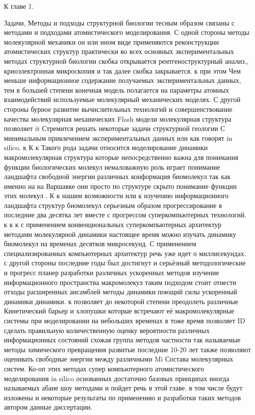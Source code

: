 ﻿К главе 1. 


Задачи, Методы и подходы структурной биологии тесным образом связаны с методами и подходами атомистического моделирования. С одной стороны методы молекулярной механики он или ином виде применяются реконструкции атомистических структур практически во всех основных экспериментальных методах структурной биологии скобка открывается рентгеноструктурный анализ,, криоэлектронная микроскопия и так далее скобка закрывается. к при этом Чем меньше информационное содержание получаемых экспериментальных данных, тем в большей степени конечная модель полагается на параметры атомных взаимодействий используемые молекулярный механических моделях.
С другой стороны бурное развитие вычислительных технологий и совершенствование качества молекулярная механических Flash модели молекулярная структура позволяет it Стремится решать некоторые задачи структурной геологии С минимальным привлечением экспериментальных данных или как говорят in silico. к 
К к Такого рода задачи относится моделирование динамики макромолекулярная структура которые непосредственно важна для понимания функции биологических молекул немаловажную роль играет понимание ландшафта свободной энергии различных конформация биомолекул так как именно на на Варшавке они просто по структуре скрыто понимание функции этих молекул .
К к нашим возможности или к изучению информационного ландшафта структур биомолекул серьезным образом прогрессирование в последние два десятка лет вместе с прогрессом суперкомпьютерных технологий. к к к с применением конвенциональных суперкомпьютерных архитектур методами молекулярной динамики настоящее время можно изучать динамику биомолекул на временах десятков микросекунд. С применением специализированных компьютерных архитектур речь уже идет о миллисекундах. с другой стороны последние годы был достигнут и серьёзный методологические и прогресс планер разработки различных ускоренных методов изучение информационного пространства макромолекул таким подходом стоит отнести отходы расширенных ансамблей методы динамики поющий силы ускоренный динамики динамики. к позволяет до некоторой степени преодолеть различные Кинетический барьер и хлопушки которые встречают её макромолекулярные системы при моделировании на небольших временах в тоже время позволяет ID сделать правильную количественную оценку вероятности различных информационных состояний схожая группа методов частности так называемые методы химического превращения развитые последние 10-20 лет также позволяют оценивать свободные энергии между различными Mi Состава молекулярных систем.
Ко-оп этих методах супер компьютерного атомистического моделирования in silico основанных достаточно базовых принципах иногда называемых абане шоу методами и пойдет речь в этой главе. в том числе будут изложены и некоторые результаты по применению и разработки таких методов автором данные диссертации.